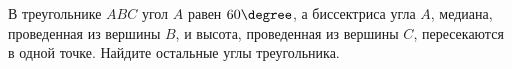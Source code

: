 \begin{ex}
	\begin{condition}
		В треугольнике \( ABC  \) угол \( A \) равен \( 60\degree\), а биссектриса угла \( A \), медиана, проведенная из вершины \( B \), и высота, проведенная из вершины \( C \), пересекаются в одной точке. Найдите остальные углы треугольника.
	\end{condition}
	\answer{\( 60\degree, 60\degree \)}
\end{ex}